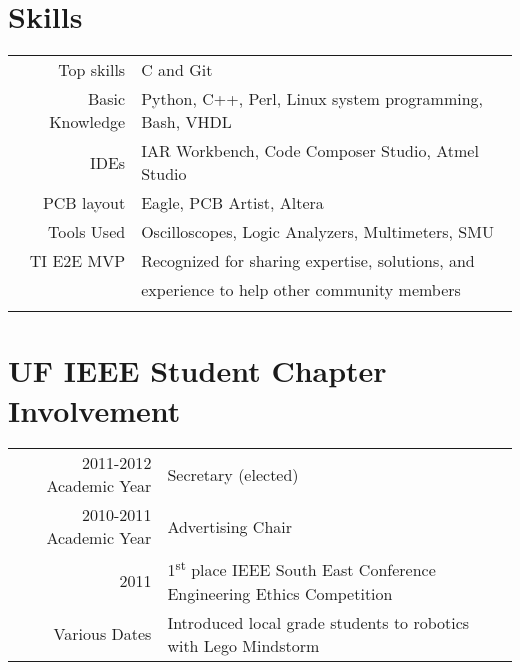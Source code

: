 \documentclass[a4paper,10pt]{article} %
\begin{document}

\section{Skills}

\begin{tabular}{rl}
Top skills & C and Git\\
Basic Knowledge & Python, C++, Perl, Linux system programming, Bash, VHDL\\
IDEs & IAR Workbench, Code Composer Studio, Atmel Studio\\
PCB layout & Eagle, PCB Artist, Altera\\
Tools Used &  Oscilloscopes, Logic Analyzers, Multimeters, SMU\\
TI E2E MVP & Recognized for sharing expertise, solutions, and \\ &  \hspace{5mm} experience to help other community members\\
\\
\end{tabular}

\section{UF IEEE Student Chapter Involvement}

\begin{tabular}{rl}
2011-2012 Academic Year &  Secretary (elected) \\

2010-2011 Academic Year & Advertising Chair \\

2011 & 1\textsuperscript{st} place IEEE South East Conference Engineering Ethics Competition\\

Various Dates & Introduced local grade students to robotics with Lego Mindstorm\\
\end{tabular}


\end{document}
